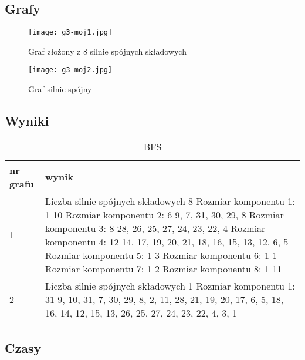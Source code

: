 \documentclass[12pt, letterpaper]{article}
\begin{document}
\subsection{Grafy}

\begin{figure}[H]
    \centering
    \texttt{[image: g3-moj1.jpg]}
    \caption{Graf złożony z 8 silnie spójnych składowych}
\end{figure}

\begin{figure}[H]
    \centering
    \texttt{[image: g3-moj2.jpg]}
    \caption{Graf silnie spójny}
\end{figure}

\subsection{Wyniki}

\begin{table}[H]\centering
    \caption{BFS}
    \begin{tabular}{|p{1cm}|p{10cm}|}\hline
        nr grafu & wynik
        \\\hline
        1        & Liczba silnie spójnych składowych 8
        Rozmiar komponentu 1: 1
        10
        Rozmiar komponentu 2: 6
        9, 7, 31, 30, 29, 8
        Rozmiar komponentu 3: 8
        28, 26, 25, 27, 24, 23, 22, 4
        Rozmiar komponentu 4: 12
        14, 17, 19, 20, 21, 18, 16, 15, 13, 12, 6, 5
        Rozmiar komponentu 5: 1
        3
        Rozmiar komponentu 6: 1
        1
        Rozmiar komponentu 7: 1
        2
        Rozmiar komponentu 8: 1
        11
        \\\hline
        2        & Liczba silnie spójnych składowych 1
        Rozmiar komponentu 1: 31
        9, 10, 31, 7, 30, 29, 8, 2, 11, 28, 21, 19, 20, 17, 6, 5, 18, 16, 14,
        12, 15, 13, 26, 25, 27, 24, 23, 22, 4, 3, 1
        \\\hline
    \end{tabular}
\end{table}

\subsection{Czasy}
\end{document}
